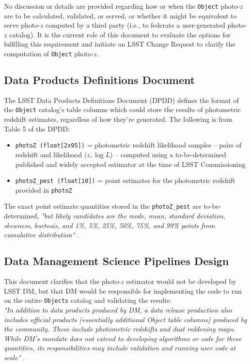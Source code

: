 \documentclass[DM,lsstdraft,toc]{lsstdoc}
\begin{document}
No discussion or details are provided regarding how or when the {\tt Object} photo-$z$ are to be calculated, validated, or served, or whether it might be equivalent to serve photo-$z$ computed by a third party (i.e., to federate a user-generated photo-$z$ catalog).
It is the current role of this document to evaluate the options for fulfilling this requirement and initiate an LSST Change Request to clarify the computation of {\tt Object} photo-$z$.

\subsection{Data Products Definitions Document}\label{ssec:docs_dpdd}

The LSST Data Products Definitions Document (DPDD)  defines the format of the {\tt Object} catalog's table columns which could store the results of photometric redshift estimates, regardless of how they're generated. 
The following is from Table 5 of the DPDD:
\vspace{-15pt}
\begin{itemize}
\item \texttt{photoZ (float[2x95])} = photometric redshift likelihood samples -- pairs of redshift and likelihood ($z,\log{L}$) -- computed using a to-be-determined published and widely accepted estimator at the time of LSST Commissioning
\item \texttt{photoZ\_pest (float[10])} = point estimates for the photometric redshift provided in {\tt photoZ}
\end{itemize}

The exact point estimate quantities stored in the \texttt{photoZ\_pest} are to-be-determined, {\it "but likely candidates are the mode, mean, standard deviation, skewness, kurtosis, and 1\%, 5\%, 25\%, 50\%, 75\%, and 99\% points from cumulative distribution"} . 

\subsection{Data Management Science Pipelines Design}\label{ssec:docs_ldm151}

This document clarifies that the photo-$z$ estimator would not be developed by LSST DM, but that DM would be responsible for implementing the code to run on the entire {\tt Objects} catalog and validating the results: \\
{\it "In addition to data products produced by DM, a data release production also includes official
products (essentially additional Object table columns) produced by the community. These
include photometric redshifts and dust reddening maps. While DM's mandate does not extend
to developing algorithms or code for these quantities, its responsibilities may include validation
and running user code at scale"} .
\end{document}
